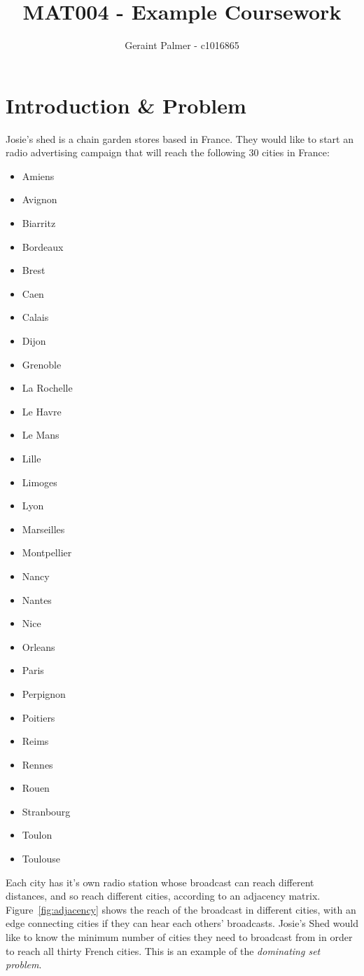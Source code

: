 \documentclass{article}
\title{MAT004 - Example Coursework}
\author{Geraint Palmer - c1016865}
\date{}
\begin{document}
\maketitle

\section{Introduction \& Problem}
Josie's shed is a chain garden stores based in France. They would like to start an radio advertising campaign that will reach the following 30 cities in France:

\begin{multicols}{5}
\begin{itemize}
  \setlength\itemsep{-0.5em}
  \item Amiens
  \item Avignon
  \item Biarritz
  \item Bordeaux
  \item Brest
  \item Caen
  \item Calais
  \item Dijon
  \item Grenoble
  \item La Rochelle
  \item Le Havre
  \item Le Mans
  \item Lille
  \item Limoges
  \item Lyon
  \item Marseilles
  \item Montpellier
  \item Nancy
  \item Nantes
  \item Nice
  \item Orleans
  \item Paris
  \item Perpignon
  \item Poitiers
  \item Reims
  \item Rennes
  \item Rouen
  \item Stranbourg
  \item Toulon
  \item Toulouse
\end{itemize}
\end{multicols}

Each city has it's own radio station whose broadcast can reach different distances, and so reach different cities, according to an adjacency matrix. Figure~\ref{fig:adjacency} shows the reach of the broadcast in different cities, with an edge connecting cities if they can hear each others' broadcasts.
Josie's Shed would like to know the minimum number of cities they need to broadcast from in order to reach all thirty French cities. This is an example of the \textit{dominating set problem}.
\end{document}
